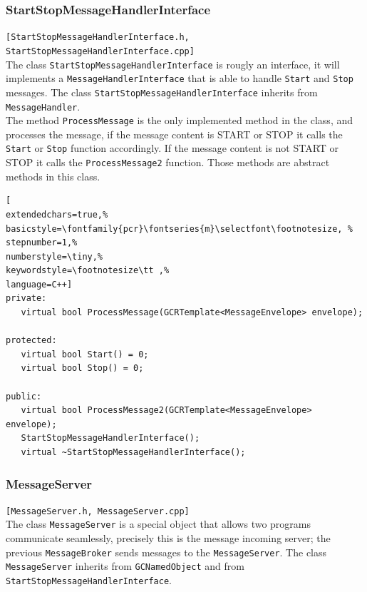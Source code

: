 \subsubsection{StartStopMessageHandlerInterface}
\texttt{[StartStopMessageHandlerInterface.h, StartStopMessageHandlerInterface.cpp]}\\
The class \texttt{StartStopMessageHandlerInterface} is rougly an interface, it will implements a \texttt{MessageHandlerInterface} that is able to handle \texttt{Start} and \texttt{Stop} messages. The class \texttt{StartStopMessageHandlerInterface} inherits from \texttt{MessageHandler}.\\


The method \texttt{ProcessMessage} is the only implemented method in the class, and processes the message, if the message content is START or STOP it calls the \texttt{Start} or \texttt{Stop} function accordingly. If the message content is not START or STOP it calls the \texttt{ProcessMessage2} function. Those methods are abstract methods in this class.
\begin{lstlisting}[
extendedchars=true,%
basicstyle=\fontfamily{pcr}\fontseries{m}\selectfont\footnotesize, %
stepnumber=1,%
numberstyle=\tiny,%
keywordstyle=\footnotesize\tt ,%
language=C++]
private:
   virtual bool ProcessMessage(GCRTemplate<MessageEnvelope> envelope);

protected:
   virtual bool Start() = 0;
   virtual bool Stop() = 0;

public:
   virtual bool ProcessMessage2(GCRTemplate<MessageEnvelope> envelope);
   StartStopMessageHandlerInterface();
   virtual ~StartStopMessageHandlerInterface();
\end{lstlisting}



\subsubsection{MessageServer}
\texttt{[MessageServer.h, MessageServer.cpp]}\\
The class \texttt{MessageServer} is a special object that allows two programs communicate seamlessly, precisely this is the message incoming server; the previous \texttt{MessageBroker} sends messages to the \texttt{MessageServer}. The class \texttt{MessageServer} inherits from \texttt{GCNamedObject} and from \texttt{StartStopMessageHandlerInterface}. \\


